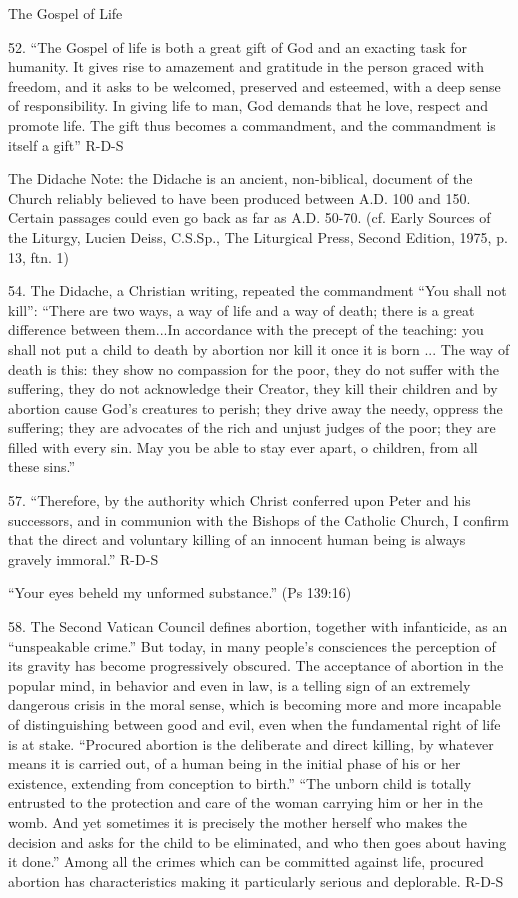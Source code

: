 \documentclass[oneside]{book}
\begin{document}
The Gospel of Life

52. ``The Gospel of life is both a great gift of God and an exacting task for
humanity. It gives rise to amazement and gratitude in the person graced with
freedom, and it asks to be welcomed, preserved and esteemed, with a deep sense
of responsibility. In giving life to man, God demands that he love, respect and
promote life. The gift thus becomes a commandment, and the commandment is itself
a gift''
R-D-S

The Didache
Note: the Didache is an ancient, non-biblical, document of the Church reliably
believed to have been produced between A.D. 100 and 150. Certain passages could
even go back as far as A.D. 50-70. (cf. Early Sources of the Liturgy, Lucien
Deiss, C.S.Sp., The Liturgical Press, Second Edition, 1975, p. 13, ftn. 1)

54. The Didache, a Christian writing, repeated the commandment ``You shall not
kill'': ``There are two ways, a way of life and a way of death; there is a great
difference between them...In accordance with the precept of the teaching: you
shall not put a child to death by abortion nor kill it once it is born ... The
way of death is this: they show no compassion for the poor, they do not suffer
with the suffering, they do not acknowledge their Creator, they kill their
children and by abortion cause God's creatures to perish; they drive away the
needy, oppress the suffering; they are advocates of the rich and unjust judges
of the poor; they are filled with every sin. May you be able to stay ever apart,
o children, from all these sins.''


57. ``Therefore, by the authority which Christ conferred upon Peter and his
successors, and in communion with the Bishops of the Catholic Church, I confirm
that the direct and voluntary killing of an innocent human being is always
gravely immoral.''
R-D-S

``Your eyes beheld my unformed substance.'' (Ps 139:16)

58. The Second Vatican Council defines abortion, together with infanticide, as
an ``unspeakable crime.'' But today, in many people's consciences the perception
of its gravity has become progressively obscured. The acceptance of abortion in
the popular mind, in behavior and even in law, is a telling sign of an extremely
dangerous crisis in the moral sense, which is becoming more and more incapable
of distinguishing between good and evil, even when the fundamental right of life
is at stake.
``Procured abortion is the deliberate and direct killing, by whatever means it
is carried out, of a human being in the initial phase of his or her existence,
extending from conception to birth.'' ``The unborn child is totally entrusted to
the protection and care of the woman carrying him or her in the womb. And yet
sometimes it is precisely the mother herself who makes the decision and asks for
the child to be eliminated, and who then goes about having it done.'' Among all
the crimes which can be committed against life, procured abortion has
characteristics making it particularly serious and deplorable.
R-D-S
\end{document}
